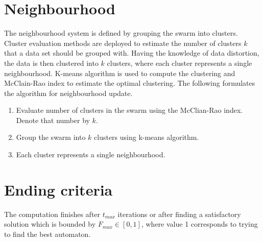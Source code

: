 \documentclass{mini}
\begin{document}
\section{Neighbourhood}
The neighbourhood system is defined by grouping the swarm into clusters. Cluster evaluation methods are deployed to estimate the number of clusters $k$ that a data set should be grouped with. Having the knowledge of data distortion, the data is then clustered into $k$ clusters, where each cluster represents a single neighbourhood. K-means algorithm is used to compute the clustering and McClain-Rao index to estimate the optimal clustering. The following formulates the algorithm for neighbourhood update.

\begin{enumerate}
    \item Evaluate number of clusters in the swarm using the McClian-Rao index. Denote that number by $k$.
    \item Group the swarm into $k$ clusters using k-means algorithm.
    \item Each cluster represents a single neighbourhood.
\end{enumerate}


\section{Ending criteria}
The computation finishes after $t_{max}$ iterations or after finding a satisfactory solution which is bounded by $F_{max} \in [0,1]$, where value 1 corresponds to trying to find the best automaton.

\end{document}
